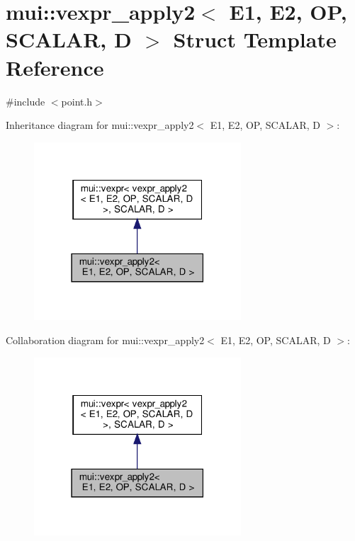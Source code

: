 \hypertarget{structmui_1_1vexpr__apply2}{}\section{mui\+:\+:vexpr\+\_\+apply2$<$ E1, E2, OP, S\+C\+A\+L\+AR, D $>$ Struct Template Reference}
\label{structmui_1_1vexpr__apply2}


{\ttfamily \#include $<$point.\+h$>$}



Inheritance diagram for mui\+:\+:vexpr\+\_\+apply2$<$ E1, E2, OP, S\+C\+A\+L\+AR, D $>$\+:
\nopagebreak
\begin{figure}[H]
\begin{center}
\leavevmode
\includegraphics[width=219pt]{structmui_1_1vexpr__apply2__inherit__graph}
\end{center}
\end{figure}


Collaboration diagram for mui\+:\+:vexpr\+\_\+apply2$<$ E1, E2, OP, S\+C\+A\+L\+AR, D $>$\+:
\nopagebreak
\begin{figure}[H]
\begin{center}
\leavevmode
\includegraphics[width=219pt]{structmui_1_1vexpr__apply2__coll__graph}
\end{center}
\end{figure}
